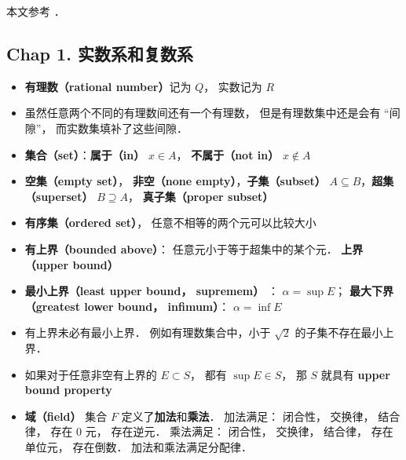 
\begin{issues}
\issueMissDepend
{}
\end{issues}

本文参考 \cite{Rudin}．

\subsection{Chap 1. 实数系和复数系}

\begin{itemize}
\item \textbf{有理数（rational number）}记为 $Q$， 实数记为 $R$

\item 虽然任意两个不同的有理数间还有一个有理数， 但是有理数集中还是会有 “间隙”， 而实数集填补了这些间隙．

\item \textbf{集合（set）}：\textbf{属于（in）} $x \in A$， \textbf{不属于（not in）} $x \notin A$

\item \textbf{空集（empty set）}， \textbf{非空（none empty）}，\textbf{子集（subset）} $A \subseteq B$，\textbf{超集（superset）} $B \supseteq A$， \textbf{真子集（proper subset）}

\item \textbf{有序集（ordered set）}， 任意不相等的两个元可以比较大小

\item \textbf{有上界（bounded above）}： 任意元小于等于超集中的某个元． \textbf{上界（upper bound）}

\item \textbf{最小上界（least upper bound， supremem）} ： $\alpha = \sup E$； \textbf{最大下界（greatest lower bound， infimum）}： $\alpha = \inf E$

\item 有上界未必有最小上界． 例如有理数集合中，小于 $\sqrt{2}$ 的子集不存在最小上界．

\item 如果对于任意非空有上界的 $E \subset S$， 都有 $\sup E \in S$， 那 $S$ 就具有 \textbf{upper bound property}

\item \textbf{域（field）} 集合 $F$ 定义了\textbf{加法}和\textbf{乘法}． 加法满足： 闭合性， 交换律， 结合律， 存在 0 元， 存在逆元． 乘法满足： 闭合性， 交换律， 结合律， 存在单位元， 存在倒数． 加法和乘法满足分配律．


\end{itemize}
